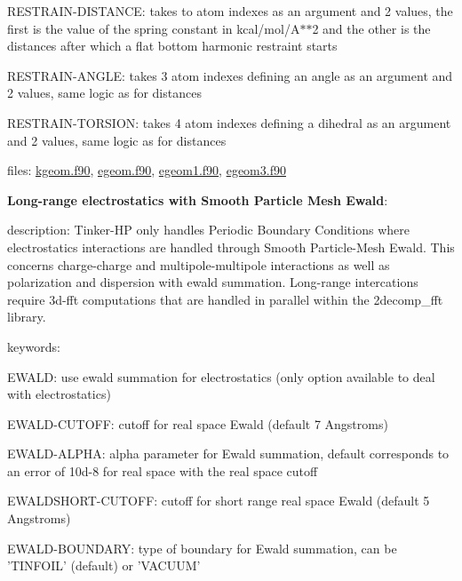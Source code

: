 \begin{DoxyItemize}
\begin{DoxyItemize}
\begin{DoxyItemize}
\item R\-E\-S\-T\-R\-A\-I\-N-\/\-D\-I\-S\-T\-A\-N\-C\-E\-: takes to atom indexes as an argument and 2 values, the first is the value of the spring constant in kcal/mol/\-A$\ast$$\ast$2 and the other is the distances after which a flat bottom harmonic restraint starts
\item R\-E\-S\-T\-R\-A\-I\-N-\/\-A\-N\-G\-L\-E\-: takes 3 atom indexes defining an angle as an argument and 2 values, same logic as for distances
\item R\-E\-S\-T\-R\-A\-I\-N-\/\-T\-O\-R\-S\-I\-O\-N\-: takes 4 atom indexes defining a dihedral as an argument and 2 values, same logic as for distances
\end{DoxyItemize}
\item files\-: \hyperlink{kgeom_8f90}{kgeom.\-f90}, \hyperlink{egeom_8f90}{egeom.\-f90}, \hyperlink{egeom1_8f90}{egeom1.\-f90}, \hyperlink{egeom3_8f90}{egeom3.\-f90}
\end{DoxyItemize}
\item {\bfseries Long-\/range electrostatics with Smooth Particle Mesh Ewald}\-:
\begin{DoxyItemize}
\item description\-: Tinker-\/\-H\-P only handles Periodic Boundary Conditions where electrostatics interactions are handled through Smooth Particle-\/\-Mesh Ewald. This concerns charge-\/charge and multipole-\/multipole interactions as well as polarization and dispersion with ewald summation. Long-\/range intercations require 3d-\/fft computations that are handled in parallel within the 2decomp\-\_\-fft library.
\item keywords\-:
\begin{DoxyItemize}
\item E\-W\-A\-L\-D\-: use ewald summation for electrostatics (only option available to deal with electrostatics)
\item E\-W\-A\-L\-D-\/\-C\-U\-T\-O\-F\-F\-: cutoff for real space Ewald (default 7 Angstroms)
\item E\-W\-A\-L\-D-\/\-A\-L\-P\-H\-A\-: alpha parameter for Ewald summation, default corresponds to an error of 10d-\/8 for real space with the real space cutoff
\item E\-W\-A\-L\-D\-S\-H\-O\-R\-T-\/\-C\-U\-T\-O\-F\-F\-: cutoff for short range real space Ewald (default 5 Angstroms)
\item E\-W\-A\-L\-D-\/\-B\-O\-U\-N\-D\-A\-R\-Y\-: type of boundary for Ewald summation, can be 'T\-I\-N\-F\-O\-I\-L' (default) or 'V\-A\-C\-U\-U\-M'

\end{DoxyItemize}
\end{DoxyItemize}
\end{DoxyItemize}
